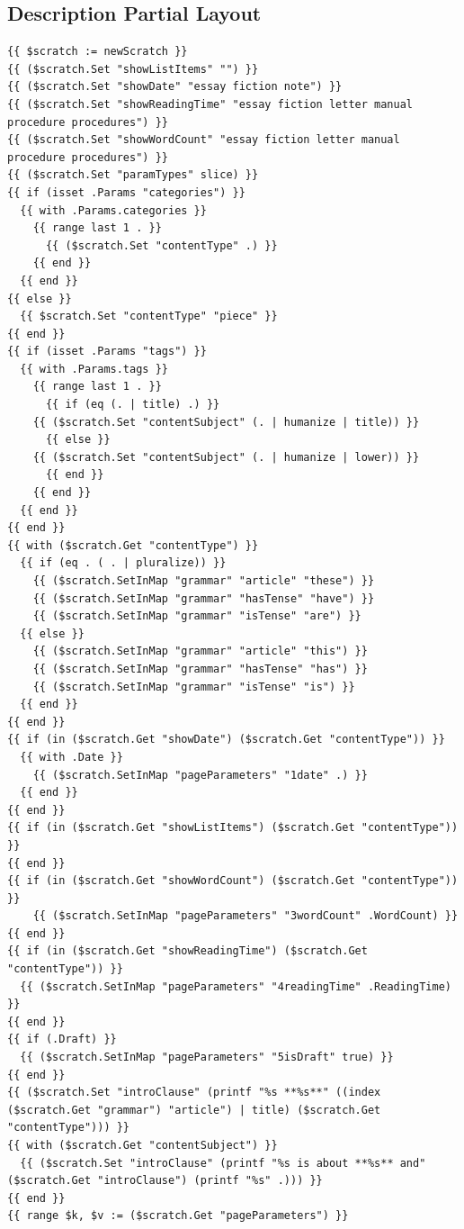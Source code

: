 \documentclass[11pt]{article}
\begin{document}
\subsection{Description Partial Layout}
\label{sec:orgb9bc518}
\begin{verbatim}
{{ $scratch := newScratch }}
{{ ($scratch.Set "showListItems" "") }}
{{ ($scratch.Set "showDate" "essay fiction note") }}
{{ ($scratch.Set "showReadingTime" "essay fiction letter manual procedure procedures") }}
{{ ($scratch.Set "showWordCount" "essay fiction letter manual procedure procedures") }}
{{ ($scratch.Set "paramTypes" slice) }}
{{ if (isset .Params "categories") }}
  {{ with .Params.categories }}
    {{ range last 1 . }}
      {{ ($scratch.Set "contentType" .) }}
    {{ end }}
  {{ end }}
{{ else }}
  {{ $scratch.Set "contentType" "piece" }}
{{ end }}
{{ if (isset .Params "tags") }}
  {{ with .Params.tags }}
    {{ range last 1 . }}
      {{ if (eq (. | title) .) }}
	{{ ($scratch.Set "contentSubject" (. | humanize | title)) }}
      {{ else }}
	{{ ($scratch.Set "contentSubject" (. | humanize | lower)) }}
      {{ end }}
    {{ end }}
  {{ end }}
{{ end }}
{{ with ($scratch.Get "contentType") }}
  {{ if (eq . ( . | pluralize)) }}
    {{ ($scratch.SetInMap "grammar" "article" "these") }}
    {{ ($scratch.SetInMap "grammar" "hasTense" "have") }}
    {{ ($scratch.SetInMap "grammar" "isTense" "are") }}
  {{ else }}
    {{ ($scratch.SetInMap "grammar" "article" "this") }}
    {{ ($scratch.SetInMap "grammar" "hasTense" "has") }}
    {{ ($scratch.SetInMap "grammar" "isTense" "is") }}
  {{ end }}
{{ end }}
{{ if (in ($scratch.Get "showDate") ($scratch.Get "contentType")) }}
  {{ with .Date }}
    {{ ($scratch.SetInMap "pageParameters" "1date" .) }}
  {{ end }}
{{ end }}
{{ if (in ($scratch.Get "showListItems") ($scratch.Get "contentType")) }}
{{ end }}
{{ if (in ($scratch.Get "showWordCount") ($scratch.Get "contentType")) }}
    {{ ($scratch.SetInMap "pageParameters" "3wordCount" .WordCount) }}
{{ end }}
{{ if (in ($scratch.Get "showReadingTime") ($scratch.Get "contentType")) }}
  {{ ($scratch.SetInMap "pageParameters" "4readingTime" .ReadingTime) }}
{{ end }}
{{ if (.Draft) }}
  {{ ($scratch.SetInMap "pageParameters" "5isDraft" true) }}
{{ end }}
{{ ($scratch.Set "introClause" (printf "%s **%s**" ((index ($scratch.Get "grammar") "article") | title) ($scratch.Get "contentType"))) }}
{{ with ($scratch.Get "contentSubject") }}
  {{ ($scratch.Set "introClause" (printf "%s is about **%s** and" ($scratch.Get "introClause") (printf "%s" .))) }}
{{ end }}
{{ range $k, $v := ($scratch.Get "pageParameters") }}

\end{verbatim}
\end{document}
